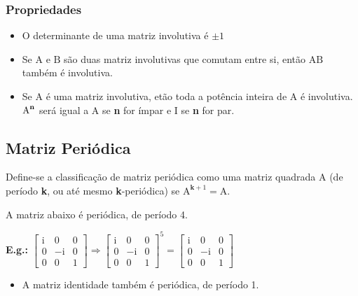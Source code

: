\documentclass[a4paper,12pt]{article}
\begin{document}
\subsubsection{Propriedades}

\begin{itemize}

    \item O determinante de uma matriz involutiva é $ \pm 1 $

    \item Se $ \text{A} $ e $ \text{B} $ são duas matriz involutivas que comutam entre si, então $ \text{A} \text{B} $ também é involutiva.
    
    \item Se $ \text{A} $ é uma matriz involutiva, etão toda a potência inteira de $ \text{A} $ é involutiva. $ \text{A}^{\text{\textbf{n}}} $ será igual a $ \text{A} $ se \textbf{n} for ímpar e $ \text{I} $ se \textbf{n} for par.
    
\end{itemize}

\subsection{Matriz Periódica}

Define-se a classificação de matriz periódica como uma matriz quadrada $ \text{A} $ (de período \textbf{k}, ou até mesmo \textbf{k}-periódica) se $ \text{A}^{\textbf{k} + 1} = \text{A} $.

A matriz abaixo é periódica, de período 4.

\textbf{E.g.:} $ \begin{bmatrix}
\text{i} & 0 & 0 \\
0 & -\text{i} & 0 \\
0 & 0 & 1
\end{bmatrix} \Rightarrow \begin{bmatrix}
\text{i} & 0 & 0 \\
0 & -\text{i} & 0 \\
0 & 0 & 1
\end{bmatrix}^{5} = \begin{bmatrix}
\text{i} & 0 & 0 \\
0 & -\text{i} & 0 \\
0 & 0 & 1
\end{bmatrix} $

\begin{itemize}
    \item A matriz identidade também é periódica, de período 1.
\end{itemize}
\end{document}
